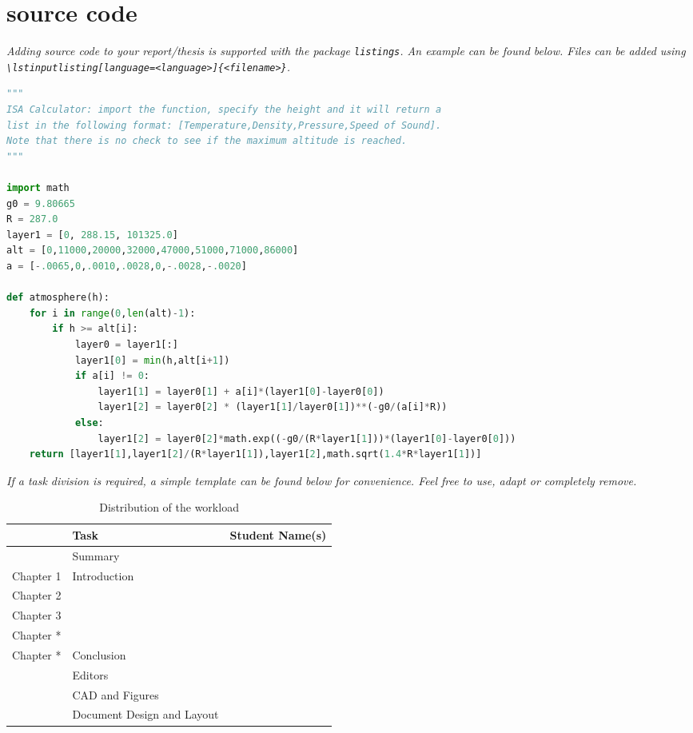 \chapter{source code}
\emph{Adding source code to your report/thesis is supported with the package {\normalfont\texttt{listings}}. An example can be found below. Files can be added using {\normalfont\texttt{\textbackslash lstinputlisting[language=<language>]\{<filename>\}}}.}

\begin{lstlisting}[language=Python]
"""
ISA Calculator: import the function, specify the height and it will return a
list in the following format: [Temperature,Density,Pressure,Speed of Sound].
Note that there is no check to see if the maximum altitude is reached.
"""

import math
g0 = 9.80665
R = 287.0
layer1 = [0, 288.15, 101325.0]
alt = [0,11000,20000,32000,47000,51000,71000,86000]
a = [-.0065,0,.0010,.0028,0,-.0028,-.0020]

def atmosphere(h):
    for i in range(0,len(alt)-1):
        if h >= alt[i]:
            layer0 = layer1[:]
            layer1[0] = min(h,alt[i+1])
            if a[i] != 0:
                layer1[1] = layer0[1] + a[i]*(layer1[0]-layer0[0])
                layer1[2] = layer0[2] * (layer1[1]/layer0[1])**(-g0/(a[i]*R))
            else:
                layer1[2] = layer0[2]*math.exp((-g0/(R*layer1[1]))*(layer1[0]-layer0[0]))
    return [layer1[1],layer1[2]/(R*layer1[1]),layer1[2],math.sqrt(1.4*R*layer1[1])]
\end{lstlisting}






\emph{If a task division is required, a simple template can be found below for convenience. Feel free to use, adapt or completely remove.}

\begin{table}[htb]
    \setlength\extrarowheight{4pt}
    \centering
    \caption{Distribution of the workload}
    \label{tab:taskdivision}
    \begin{tabularx}{\textwidth}{lXX}
        \toprule
        & Task & Student Name(s) \\
        \midrule
        & Summary & \\
        Chapter 1 & Introduction &  \\
        Chapter 2 &  & \\
        Chapter 3 &  & \\
        Chapter * &  & \\
        Chapter * & Conclusion &  \\
        \midrule
        & Editors & \\
        & CAD and Figures & \\
        & Document Design and Layout & \\
        \bottomrule
    \end{tabularx}
\end{table}
